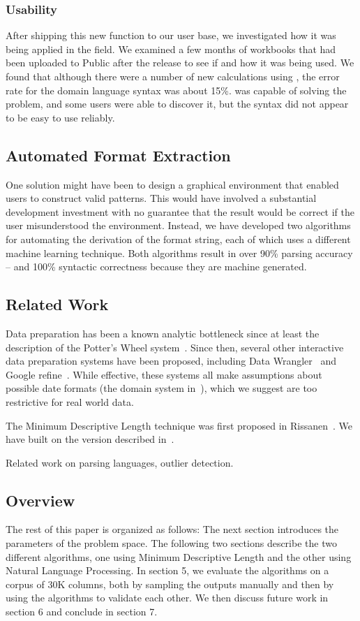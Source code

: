 \subsubsection{	Usability}
After shipping this new function to our user base, we investigated how it was being applied in the field. We examined a few months of workbooks that had been uploaded to Public after the release to see if and how it was being used. We found that although there were a number of new calculations using \dateparse, the error rate for the domain language syntax was about 15\%. \dateparse was capable of solving the problem, and some users were able to discover it, but the syntax did not appear to be easy to use reliably.

\subsection{Automated Format Extraction}
One solution might have been to design a graphical environment that enabled users to construct valid patterns. This would have involved a substantial development investment with no guarantee that the result would be correct if the user misunderstood the environment. Instead, we have developed two algorithms for automating the derivation of the format string, each of which uses a different machine learning technique. Both algorithms result in over 90\% parsing accuracy -- and 100\% syntactic correctness because they are machine generated.


\subsection{Related Work}
Data preparation has been a known analytic bottleneck since at least the description of the Potter's Wheel system~\cite{Ramen:2001}. Since then, several other interactive data preparation systems have been proposed, including Data Wrangler~\cite{Kandel:2001} and Google refine~\cite{Refine}. While effective, these systems all make assumptions about possible date formats (\eg the domain system in~\cite{Ramen:2001}), which we suggest are too restrictive for real world data.

The Minimum Descriptive Length technique was first proposed in Rissanen~\cite{Rissanen:1978}.  We have built on the version described in~\cite{Ramen:2001}.

Related work on parsing languages, outlier detection.

\subsection{Overview}
The rest of this paper is organized as follows: The next section introduces the parameters of the problem space. The following two sections describe the two different algorithms, one using Minimum Descriptive Length and the other using Natural Language Processing. In section 5, we evaluate the algorithms on a corpus of 30K columns, both by sampling the outputs manually and then by using the algorithms to validate each other. We then discuss future work in section 6 and conclude in section 7.
